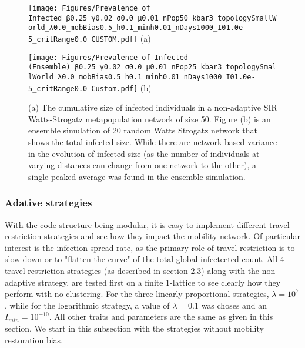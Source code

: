 \begin{figure}[!ht]
	\centering
	\begin{minipage}[b]{0.45\textwidth}
		\texttt{[image: Figures/Prevalence of Infected\_β0.25\_γ0.02\_σ0.0\_μ0.01\_nPop50\_kbar3\_topologySmallWorld\_λ0.0\_mobBias0.5\_h0.1\_minh0.01\_nDays1000\_I01.0e-5\_critRange0.0 CUSTOM.pdf]}
		\centering
		(a)
	\end{minipage}
	\hfill
	\begin{minipage}[b]{0.45\textwidth}
		\texttt{[image: Figures/Prevalence of Infected (Ensemble)\_β0.25\_γ0.02\_σ0.0\_μ0.01\_nPop25\_kbar3\_topologySmallWorld\_λ0.0\_mobBias0.5\_h0.1\_minh0.01\_nDays1000\_I01.0e-5\_critRange0.0 Custom.pdf]}
		\centering
		(b)
	\end{minipage}
	\caption{\small  (a) The cumulative size of infected individuals in a non-adaptive SIR Watts-Strogatz metapopulation network of size 50. Figure (b) is an ensemble simulation of 20 random Watts Strogatz network that shows the total infected size. While there are network-based variance in the evolution of infected size (as the number of individuals at varying distances can change from one network to the other), a single peaked average was found in the ensemble simulation.}
	\label{fig:Infected-Evolution-cumu-and-ensemble}
\end{figure}

\subsubsection{Adative strategies}

With the code structure being modular, it is easy to implement different travel restriction strategies and see how they impact the mobility network. Of particular interest is the infection spread rate, as the primary role of travel restriction is to slow down or to "flatten the curve" of the total global infectected count. All 4 travel restriction strategies (as described in section 2.3) along with the non-adaptive strategy, are tested first on a finite 1-lattice to see clearly how they perform with no clustering. For the three linearly proportional strategies, $\lambda=10^7$, while for the logarithmic strategy, a value of $\lambda = 0.1$ was choses and an $I_{min}=10^{-10}$.  All other traits and parameters are the same as given in this section. We start in this subsection with the strategies without mobility restoration bias. \\

